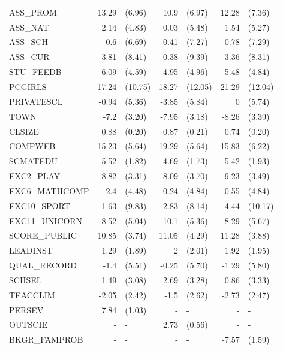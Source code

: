 \documentclass[10pt]{article}
\begin{document}
\begin{table}[H]
\begin{threeparttable}
\begin{tabular}{lrlrlrl}
				ASS\_PROM & 13.29 & (6.96) & 10.9  & (6.97) & 12.28 & (7.36) \\[0.2em]
				ASS\_NAT & 2.14  & (4.83) & 0.03  & (5.48) & 1.54  & (5.27) \\[0.2em]
				ASS\_SCH & 0.6   & (6.69) & -0.41 & (7.27) & 0.78  & (7.29) \\[0.2em]
				ASS\_CUR & -3.81 & (8.41) & 0.38  & (9.39) & -3.36 & (8.31) \\[0.2em]
				STU\_FEEDB & 6.09  & (4.59) & 4.95  & (4.96) & 5.48  & (4.84) \\[0.2em]
				PCGIRLS & 17.24 & (10.75) & 18.27 & (12.05) & 21.29 & (12.04) \\[0.2em]
				PRIVATESCL & -0.94 & (5.36) & -3.85 & (5.84) & 0     & (5.74) \\[0.2em]
				TOWN  & -7.2  & (3.20) & -7.95 & (3.18) & -8.26 & (3.39) \\[0.2em]
				CLSIZE & 0.88  & (0.20) & 0.87  & (0.21) & 0.74  & (0.20) \\[0.2em]
				COMPWEB & 15.23 & (5.64) & 19.29 & (5.64) & 15.83 & (6.22) \\[0.2em]
				SCMATEDU & 5.52  & (1.82) & 4.69  & (1.73) & 5.42  & (1.93) \\[0.2em]
				EXC2\_PLAY & 8.82  & (3.31) & 8.09  & (3.70) & 9.23  & (3.49) \\[0.2em]
				EXC6\_MATHCOMP & 2.4   & (4.48) & 0.24  & (4.84) & -0.55 & (4.84) \\[0.2em]
				EXC10\_SPORT & -1.63 & (9.83) & -2.83 & (8.14) & -4.44 & (10.17) \\[0.2em]
				EXC11\_UNICORN & 8.52  & (5.04) & 10.1  & (5.36) & 8.29  & (5.67) \\[0.2em]
				SCORE\_PUBLIC & 10.85 & (3.74) & 11.05 & (4.29) & 11.28 & (3.88) \\[0.2em]
				LEADINST & 1.29  & (1.89) & 2     & (2.01) & 1.92  & (1.95) \\[0.2em]
				QUAL\_RECORD & -1.4  & (5.51) & -0.25 & (5.70) & -1.29 & (5.80) \\[0.2em]
				SCHSEL & 1.49  & (3.08) & 2.69  & (3.28) & 0.86  & (3.33) \\[0.2em]
				TEACCLIM & -2.05 & (2.42) & -1.5  & (2.62) & -2.73 & (2.47) \\[0.2em]
				PERSEV & 7.84  & (1.03) & -     & -     & -     & - \\[0.2em]
				OUTSCIE & -     & -     & 2.73  & (0.56) & -     & - \\[0.2em]
				BKGR\_FAMPROB & -     & -     & -     & -     & -7.57 & (1.59) \\[0.2em]

\end{tabular}
\end{threeparttable}
\end{table}
\end{document}
